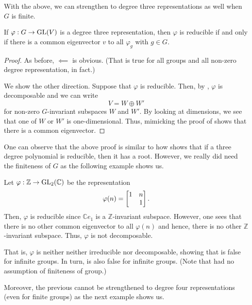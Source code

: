 With the above, we can strengthen  to degree three representations as well when $G$ is finite.
\begin{prop} \label{prop:deg3repirreducible}
	If $\varphi:G\to \operatorname{GL}(V)$ is a degree three representation, then $\varphi$ is reducible if and only if there is a common eigenvector $v$ to all $\varphi_g$ with $g \in G.$
\end{prop}
\begin{proof} 
	As before, $\impliedby$ is obvious. (That is true for all groups and all non-zero degree representation, in fact.)

	We show the other direction. Suppose that $\varphi$ is reducible. Then, by , $\varphi$ is decomposable and we can write
	\begin{equation*} 
		V = W \oplus W'
	\end{equation*}
	for non-zero $G$-invariant subspaces $W$ and $W'.$ By looking at dimensions, we see that one of $W$ or $W'$ is one-dimensional. Thus, mimicking the proof of  shows that there is a common eigenvector.
\end{proof}
One can observe that the above proof is similar to how shows that if a three degree polynomial is reducible, then it has a root. However, we really did need the finiteness of $G$ as the following example shows us.

\begin{ex} \label{ex:Zredbutnotdecomposable}
	Let $\varphi:\mathbb{Z} \to \operatorname{GL}_2(\mathbb{C})$ be the representation
	\begin{equation*} 
		\varphi(n) = \begin{bmatrix} 1 & n \\  & 1 \end{bmatrix}.
	\end{equation*}
	Then, $\varphi$ is reducible since $\mathbb{C}e_1$ is a $\mathbb{Z}$-invariant subspace. However, one sees that there is no other common eigenvector to all $\varphi(n)$ and hence, there is no other $\mathbb{Z}$-invariant subspace. Thus, $\varphi$ is not decomposable.

	That is, $\varphi$ is neither neither irreducible nor decomposable, showing that  is false for infinite groups. In turn,  is also false for infinite groups. (Note that  had no  assumption of finiteness of group.)
\end{ex}

Moreover, the previous cannot be strengthened to degree four representations (even for finite groups) as the next example shows us.

